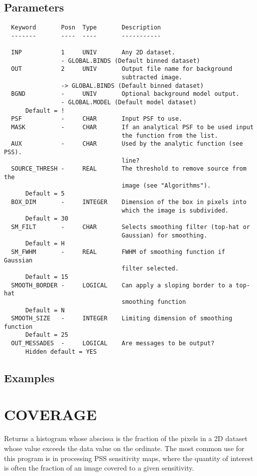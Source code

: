 \documentclass{book}
\renewcommand{\_}{{\tt\char'137}}     %
\begin{document}
\subsection{Parameters}
\begin{verbatim}
  Keyword       Posn  Type       Description
  -------       ----  ----       -----------

  INP           1     UNIV       Any 2D dataset.
                - GLOBAL.BINDS (Default binned dataset)
  OUT           2     UNIV       Output file name for background
                                 subtracted image.
                -> GLOBAL.BINDS (Default binned dataset)
  BGND          -     UNIV       Optional background model output.
                - GLOBAL.MODEL (Default model dataset)
      Default = !
  PSF           -     CHAR       Input PSF to use.
  MASK          -     CHAR       If an analytical PSF to be used input
                                 the function from the list.
  AUX           -     CHAR       Used by the analytic function (see PSS).
                                 line?
  SOURCE_THRESH -     REAL       The threshold to remove source from the
                                 image (see "Algorithms").
      Default = 5
  BOX_DIM       -     INTEGER    Dimension of the box in pixels into
                                 which the image is subdivided.
      Default = 30
  SM_FILT       -     CHAR       Selects smoothing filter (top-hat or
                                 Gaussian) for smoothing.
      Default = H
  SM_FWHM       -     REAL       FWHM of smoothing function if Gaussian
                                 filter selected.
      Default = 15
  SMOOTH_BORDER -     LOGICAL    Can apply a sloping border to a top-hat
                                 smoothing function
      Default = N
  SMOOTH_SIZE   -     INTEGER    Limiting dimension of smoothing function
      Default = 25
  OUT_MESSADES  -     LOGICAL    Are messages to be output?
      Hidden default = YES

\end{verbatim}\subsection{Examples}
\section{COVERAGE}
Returns a histogram whose abscissa is the fraction of the pixels in
a 2D dataset whose value exceeds the data value on the ordinate.
The most common use for this program is in processing PSS sensitivity
maps, where the quantity of interest is often the fraction of an
image covered to a given sensitivity.
\end{document}
